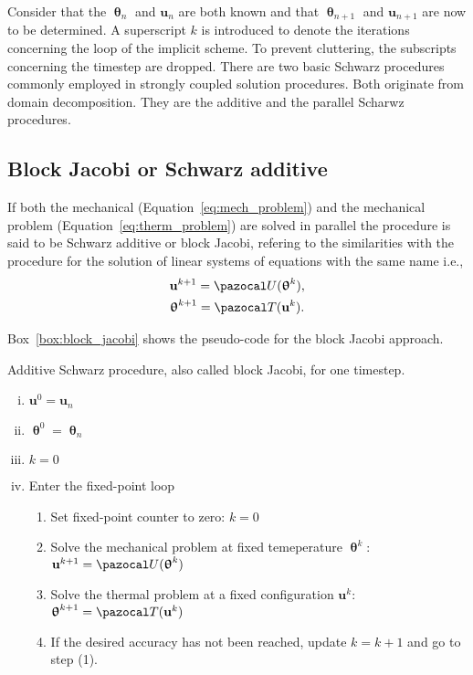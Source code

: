 Consider that the $\bm \uptheta_n$ and $\mathbf u_n$ are both known and that $\bm \uptheta_{n+1}$ and $\mathbf u_{n+1}$ are now to be determined.
A superscript $k$ is introduced to denote the iterations concerning the loop of the implicit scheme. To prevent cluttering, the subscripts concerning the timestep are dropped.
There are two basic Schwarz procedures commonly employed in strongly coupled solution procedures. Both originate from domain decomposition.
They are the additive and the parallel Scharwz procedures.

\subsection{Block Jacobi or Schwarz additive}

If both the mechanical (Equation~\eqref{eq:mech_problem}) and the mechanical problem (Equation~\eqref{eq:therm_problem}) are solved in parallel the procedure is said to be Schwarz additive or block Jacobi, refering to the similarities with the procedure for the solution of linear systems of equations with the same name i.e.,
\begin{gather}
\mathbf u^{k+1} = \pazocal U(\bm \uptheta^k),\\
\bm \uptheta^{k+1} = \pazocal T(\mathbf u^k).
\end{gather}

Box~\ref{box:block_jacobi} shows the pseudo-code for the block Jacobi approach.

\begin{framedbox}[htb]
  \caption{Additive Schwarz procedure, also called block Jacobi, for one timestep.}
  \label{box:block_jacobi}
  \begin{center}
    \begin{minipage}{0.9\textwidth}
    \begin{enumerate}[(i)]
    \item \(\mathbf u^0 = \mathbf u_{n}\)
    \item \(\bm \uptheta^0 = \bm \uptheta_n\)
    \item \(k=0\)
    \item Enter the fixed-point loop
    \begin{enumerate}[(1)]
      \item Set fixed-point counter to zero: \(k=0\)
      \item Solve the mechanical problem at fixed temeperature \(\bm \uptheta^k\): \(\mathbf u^{k+1} = \pazocal U(\bm \uptheta^k)\)
      \item Solve the thermal problem at a fixed configuration \(\mathbf u^k\): \(\bm \uptheta^{k+1} = \pazocal T(\mathbf u^k)\)
      \item If the desired accuracy has not been reached, update \(k=k+1\) and go to step (1).

    \end{enumerate}
    \end{enumerate}
    \end{minipage}
  \end{center}
\end{framedbox}

